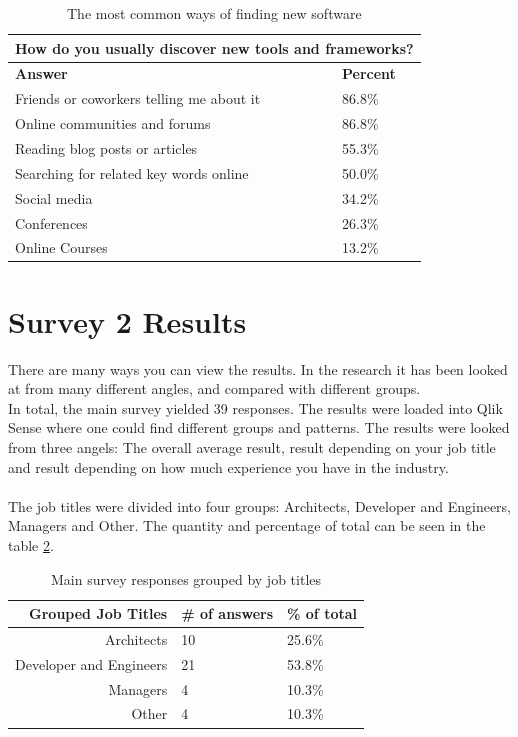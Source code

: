 \documentclass{cslthse-msc}
\begin{document}
    \begin{table}[H]
        \centering
        \caption{The most common ways of finding new software}
        \label{tab:discover}
        \begin{tabularx}{\columnwidth}{X|l}
            \multicolumn{2}{c}{\textbf{How do you usually discover new tools and frameworks?}} \\ \hline \hline
            \textbf{Answer} & \textbf{Percent} \\ \hline
            Friends or coworkers telling me about it	&	86.8\% \\
            Online communities and forums	&	86.8\% \\
            Reading blog posts or articles	&	55.3\% \\
            Searching for related key words online	&	50.0\% \\
            Social media	&	34.2\% \\
            Conferences	&	26.3\% \\
            Online Courses	&	13.2\% \\ \hline
        \end{tabularx}
    \end{table}

    \section{Survey 2 Results}
    There are many ways you can view the results. In the research it has been looked at from many different angles, and compared with different groups. \\
    In total, the main survey yielded 39 responses. The results were loaded into Qlik Sense
    where one could find different groups and patterns. The results were looked from three angels: The overall average result, result depending
    on your job title and result depending on how much experience you have
    in the industry.
    \\ \\
    The job titles were divided into four groups: Architects, Developer and
    Engineers, Managers and Other. The quantity and percentage of total can
    be seen in the table \ref{tabl:jobs}.

    \begin{table}[H]
        \centering
        \caption{Main survey responses grouped by job titles}
        \label{tabl:jobs}
        \begin{tabularx}{\columnwidth}{r l l}
            \textbf{Grouped Job Titles} &    \textbf{\# of answers} &     \textbf{\% of total} \\\hline
            Architects              & 10           & 25.6\%  \\ \hline
            Developer and Engineers & 21           & 53.8\%  \\\hline
            Managers                & 4            & 10.3\%  \\\hline
            Other                   & 4            & 10.3\%  \\\hline
        \end{tabularx}
    \end{table}
\end{document}
